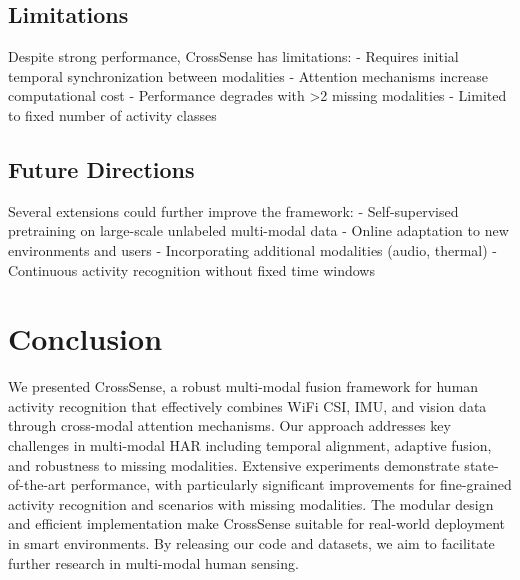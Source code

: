 \documentclass[10pt,twocolumn]{article}
\begin{document}
\subsection{Limitations}

Despite strong performance, CrossSense has limitations:
- Requires initial temporal synchronization between modalities
- Attention mechanisms increase computational cost
- Performance degrades with >2 missing modalities
- Limited to fixed number of activity classes

\subsection{Future Directions}

Several extensions could further improve the framework:
- Self-supervised pretraining on large-scale unlabeled multi-modal data
- Online adaptation to new environments and users
- Incorporating additional modalities (audio, thermal)
- Continuous activity recognition without fixed time windows

\section{Conclusion}

We presented CrossSense, a robust multi-modal fusion framework for human activity recognition that effectively combines WiFi CSI, IMU, and vision data through cross-modal attention mechanisms. Our approach addresses key challenges in multi-modal HAR including temporal alignment, adaptive fusion, and robustness to missing modalities. Extensive experiments demonstrate state-of-the-art performance, with particularly significant improvements for fine-grained activity recognition and scenarios with missing modalities. The modular design and efficient implementation make CrossSense suitable for real-world deployment in smart environments. By releasing our code and datasets, we aim to facilitate further research in multi-modal human sensing.



\end{document}
